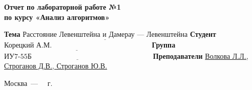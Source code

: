 \begin{titlepage}
  
  \begin{center}
    \Large\textbf{Отчет по лабораторной работе №1\\\hspace{2.25cm} по курсу «Анализ алгоритмов»}\newline
  \end{center}
  
  \noindent\textbf{Тема} $\underline{\text{Расстояние Левенштейна и Дамерау~---~Левенштейна}}$\newline\newline\newline
  \noindent\textbf{Студент} $\underline{\text{Корецкий А.М.~~~~~~~~~~~~~~~~~~~~~~~~~~~~~~~~~~~~~~~~~}}$\newline\newline
  \noindent\textbf{Группа} $\underline{\text{ИУ7-55Б~~~~~~~~~~~~~~~~~~~~~~~~~~~~~~~~~~~~~~~~~~~~~~~~~~}}$\newline\newline
  \noindent\textbf{Преподаватели} \underline{Волкова Л.Л., Строганов Д.В., Строганов Ю.В.}\newline
  
  \begin{center}
    \vfill
    Москва~---~\the\year
	~г.
  \end{center}
 \restoregeometry
\end{titlepage}